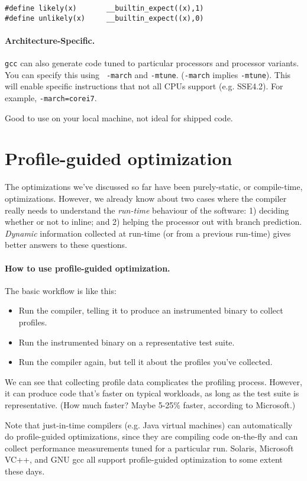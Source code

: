   \begin{verbatim}
#define likely(x)       __builtin_expect((x),1)
#define unlikely(x)     __builtin_expect((x),0)
  \end{verbatim}

\paragraph{Architecture-Specific.} {\tt gcc} can also generate code tuned to particular
processors and processor variants. You can specify this using {\tt
  -march} and {\tt -mtune}. ({\tt -march} implies {\tt -mtune}).
This will enable specific instructions that not all CPUs support (e.g. SSE4.2).
For example, {\tt -march=corei7}. 

\noindent
Good to use on your local machine, not ideal for shipped code.

\section*{Profile-guided optimization}
The optimizations we've discussed so far have been purely-static, or
compile-time, optimizations. However, we already know about two cases
where the compiler really needs to understand the \emph{run-time}
behaviour of the software: 1) deciding whether or not to inline; and 2)
helping the processor out with branch prediction. \emph{Dynamic} information
collected at run-time (or from a previous run-time) gives better answers to
these questions.

\paragraph{How to use profile-guided optimization.} The basic
workflow is like this:
\begin{itemize}
\item Run the compiler, telling it to produce an instrumented
binary to collect profiles.
\item Run the instrumented binary on a representative test suite.
\item Run the compiler again, but tell it about the profiles you've
collected.
\end{itemize}
We can see that collecting profile data complicates the profiling
process.  However, it can produce code that's faster on typical
workloads, as long as the test suite is representative. (How much
faster? Maybe 5-25\% faster, according to Microsoft.)

Note that just-in-time compilers (e.g. Java virtual machines) can
automatically do profile-guided optimizations, since they are
compiling code on-the-fly and can collect performance measurements
tuned for a particular run. Solaris, Microsoft VC++, and GNU gcc all
support profile-guided optimization to some extent these days.

